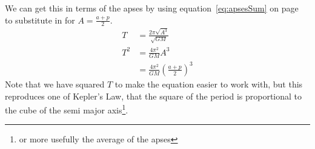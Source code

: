 We can get this in terms of the apses by using equation~\ref{eq:apsesSum} on page~\pageref{eq:apsesSum} to substitute in for $A=\frac{a+p}{2}$.
\begin{align}
T &= \frac{2 \pi \sqrt{A^3}}{\sqrt{GM}}\nonumber \\
T^2 &= \frac{4 \pi^2 }{GM}A^3\nonumber \\
 &= \frac{4 \pi^2 }{GM}\left(\frac{a+p}{2}\right)^3\label{eq:PeriodApses}
\end{align}
Note that we have squared $T$ to make the equation easier to work with, but this reproduces one of Kepler's Law, that the square of the period is proportional to the cube of the semi major axis\footnote{or more usefully the average of the apses}.